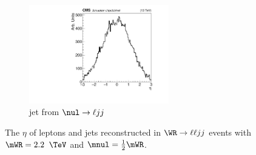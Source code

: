 \begin{figure}
\begin{subfigure}[t]{2.4in}
		\includegraphics[width=2.4in]{figures/etaMatchedRecoJetTwo_mwr2200_mnu1100.pdf}
		\caption{jet from $\nul \rightarrow \ell jj$}\label{fig:wrLeptJetEtasd}
	\end{subfigure}
	\caption{The $\eta$ of leptons and jets reconstructed in $\WR \rightarrow \ell\ell jj$ events with $\mWR = 2.2$ $\TeV$ 
		and $\mnul = \frac{1}{2}\mWR$.}\label{fig:wrLeptJetEtas}
\end{figure}

